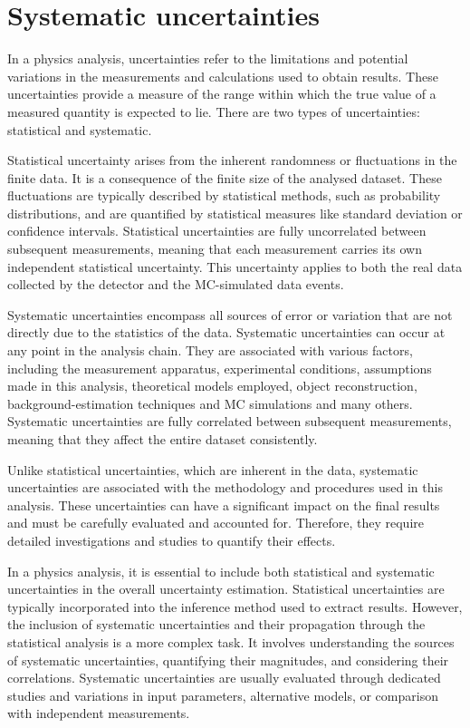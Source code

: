 \section{Systematic uncertainties}
\label{sec:ChaptH:Systematics}
In a physics analysis, uncertainties refer to the limitations and potential variations in the measurements 
and calculations used to obtain results. These uncertainties provide a measure of the range within which 
the true value of a measured quantity is expected to lie. There are two types of uncertainties: 
statistical and systematic.

Statistical uncertainty arises from the inherent randomness or fluctuations in the finite data. It is a 
consequence of the finite size of the analysed dataset. These fluctuations are typically described by 
statistical methods, such as probability distributions, and are quantified by statistical measures like 
standard deviation or confidence intervals. Statistical uncertainties are fully uncorrelated between 
subsequent measurements, meaning that each measurement carries its own independent statistical 
uncertainty. This uncertainty applies to both the real data collected by the detector
and the MC-simulated data events.


Systematic uncertainties encompass all sources of error or variation that are not 
directly due to the statistics of the data. 
Systematic uncertainties can occur at any point in the analysis chain.
They are associated with various factors, including the measurement apparatus, 
experimental conditions, assumptions made in this analysis, theoretical models employed, object reconstruction, background-estimation techniques and MC 
simulations and many others. Systematic uncertainties are fully correlated between subsequent 
measurements, meaning that they affect the entire dataset consistently.

Unlike statistical uncertainties, which are inherent in the data, systematic uncertainties are associated 
with the methodology and procedures used in this analysis. These uncertainties can have a significant 
impact on the final results and must be carefully evaluated and accounted for. Therefore, they require 
detailed investigations and studies to quantify their effects.

In a physics analysis, it is essential to include both statistical and systematic uncertainties in the overall 
uncertainty estimation. Statistical uncertainties are typically incorporated into the inference method used 
to extract results. However, the inclusion of systematic uncertainties and their propagation through the 
statistical analysis is a more complex task. It involves understanding the sources of systematic 
uncertainties, quantifying their magnitudes, and considering their correlations. Systematic uncertainties 
are usually evaluated through dedicated studies and variations in input parameters, alternative models, 
or comparison with independent measurements.

